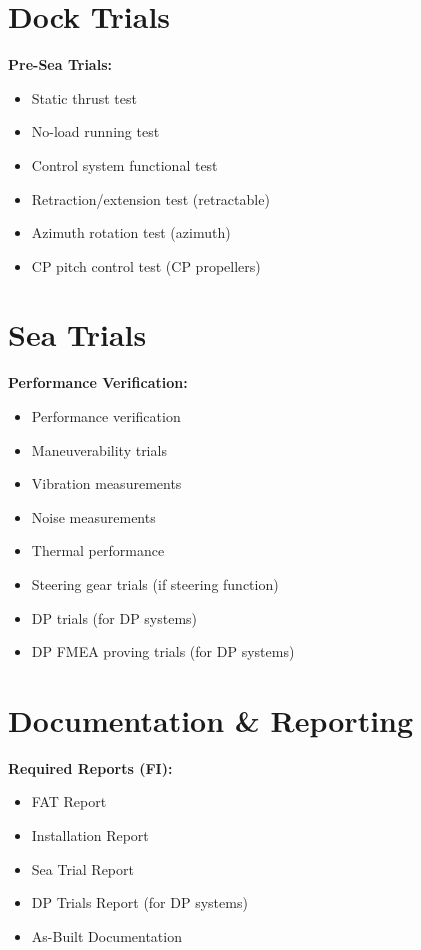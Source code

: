 \documentclass[11pt,a4paper]{report}
\newcommand{\fic}{\textbf{\textcolor{bvgray}{FI}}}
\begin{document}
\section{Dock Trials}

\textbf{Pre-Sea Trials:}
\begin{itemize}[leftmargin=*]
\item Static thrust test
\item No-load running test
\item Control system functional test
\item Retraction/extension test (retractable)
\item Azimuth rotation test (azimuth)
\item CP pitch control test (CP propellers)
\end{itemize}

\section{Sea Trials}

\textbf{Performance Verification:}
\begin{itemize}[leftmargin=*]
\item Performance verification
\item Maneuverability trials
\item Vibration measurements
\item Noise measurements
\item Thermal performance
\item Steering gear trials (if steering function)
\item DP trials (for DP systems)
\item DP FMEA proving trials (for DP systems)
\end{itemize}

\section{Documentation \& Reporting}

\textbf{Required Reports (\fic{}):}
\begin{itemize}[leftmargin=*]
\item FAT Report
\item Installation Report
\item Sea Trial Report
\item DP Trials Report (for DP systems)
\item As-Built Documentation
\end{itemize}
\end{document}
